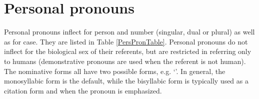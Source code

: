 \section{Personal pronouns}\label{personalPronouns}
Personal pronouns inflect for person and number (singular, dual or plural) as well as for case. They are listed in Table \vref{PersPronTable}. Personal pronouns do not inflect for the biological sex of their referents, but are restricted in referring only to humans (demonstrative pronouns are used when the referent is not human). 
The nominative forms all have two possible forms, e.g. \TILDE{} ‘’. In general, the monosyllabic form is the default, while the bisyllabic form is typically used as a citation form and when the pronoun is emphasized.
